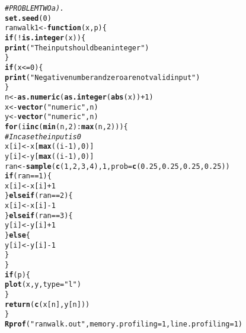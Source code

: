 \documentclass{article}\usepackage[]{graphicx}\usepackage[]{color}
\makeatletter
\newcommand{\hlnum}[1]{\textcolor[rgb]{0.686,0.059,0.569}{#1}}%
\newcommand{\hlstr}[1]{\textcolor[rgb]{0.192,0.494,0.8}{#1}}%
\newcommand{\hlcom}[1]{\textcolor[rgb]{0.678,0.584,0.686}{\textit{#1}}}%
\newcommand{\hlopt}[1]{\textcolor[rgb]{0,0,0}{#1}}%
\newcommand{\hlstd}[1]{\textcolor[rgb]{0.345,0.345,0.345}{#1}}%
\newcommand{\hlkwa}[1]{\textcolor[rgb]{0.161,0.373,0.58}{\textbf{#1}}}%
\newcommand{\hlkwb}[1]{\textcolor[rgb]{0.69,0.353,0.396}{#1}}%
\newcommand{\hlkwc}[1]{\textcolor[rgb]{0.333,0.667,0.333}{#1}}%
\newcommand{\hlkwd}[1]{\textcolor[rgb]{0.737,0.353,0.396}{\textbf{#1}}}%
\newenvironment{kframe}{%
 \def\at@end@of@kframe{}%
 \ifinner\ifhmode%
  \def\at@end@of@kframe{\end{minipage}}%
  \begin{minipage}{\columnwidth}%
 \fi\fi%
 \def\FrameCommand##1{\hskip\@totalleftmargin \hskip-\fboxsep
 \colorbox{shadecolor}{##1}\hskip-\fboxsep
     \hskip-\linewidth \hskip-\@totalleftmargin \hskip\columnwidth}%
 \MakeFramed {\advance\hsize-\width
   \@totalleftmargin\z@ \linewidth\hsize
   \@setminipage}}%
 {\par\unskip\endMakeFramed%
 \at@end@of@kframe}
\newenvironment{knitrout}{}{} %
\makeatother
\begin{document}
\begin{knitrout}
\color{fgcolor}\begin{kframe}
\begin{alltt}
\hlcom{# PROBLEM TWO a).}
\hlkwd{set.seed}\hlstd{(}\hlnum{0}\hlstd{)}
\hlstd{ranwalk1} \hlkwb{<-} \hlkwa{function}\hlstd{(}\hlkwc{x}\hlstd{,} \hlkwc{p}\hlstd{) \{}
    \hlkwa{if} \hlstd{(}\hlopt{!}\hlkwd{is.integer}\hlstd{(x)) \{}
        \hlkwd{print}\hlstd{(}\hlstr{"The input should be an integer"}\hlstd{)}
    \hlstd{\}}
    \hlkwa{if} \hlstd{(x} \hlopt{<=} \hlnum{0}\hlstd{) \{}
        \hlkwd{print}\hlstd{(}\hlstr{"Negative number and zero are not valid input"}\hlstd{)}
    \hlstd{\}}
    \hlstd{n} \hlkwb{<-} \hlkwd{as.numeric}\hlstd{(}\hlkwd{as.integer}\hlstd{(}\hlkwd{abs}\hlstd{(x))} \hlopt{+} \hlnum{1}\hlstd{)}
    \hlstd{x} \hlkwb{<-} \hlkwd{vector}\hlstd{(}\hlstr{"numeric"}\hlstd{, n)}
    \hlstd{y} \hlkwb{<-} \hlkwd{vector}\hlstd{(}\hlstr{"numeric"}\hlstd{, n)}
    \hlkwa{for} \hlstd{(i} \hlkwa{in} \hlkwd{c}\hlstd{(}\hlkwd{min}\hlstd{(n,} \hlnum{2}\hlstd{)}\hlopt{:}\hlkwd{max}\hlstd{(n,} \hlnum{2}\hlstd{))) \{}
        \hlcom{# In case the input is 0}
        \hlstd{x[i]} \hlkwb{<-} \hlstd{x[}\hlkwd{max}\hlstd{((i} \hlopt{-} \hlnum{1}\hlstd{),} \hlnum{0}\hlstd{)]}
        \hlstd{y[i]} \hlkwb{<-} \hlstd{y[}\hlkwd{max}\hlstd{((i} \hlopt{-} \hlnum{1}\hlstd{),} \hlnum{0}\hlstd{)]}
        \hlstd{ran} \hlkwb{<-} \hlkwd{sample}\hlstd{(}\hlkwd{c}\hlstd{(}\hlnum{1}\hlstd{,} \hlnum{2}\hlstd{,} \hlnum{3}\hlstd{,} \hlnum{4}\hlstd{),} \hlnum{1}\hlstd{,} \hlkwc{prob} \hlstd{=} \hlkwd{c}\hlstd{(}\hlnum{0.25}\hlstd{,} \hlnum{0.25}\hlstd{,} \hlnum{0.25}\hlstd{,} \hlnum{0.25}\hlstd{))}
        \hlkwa{if} \hlstd{(ran} \hlopt{==} \hlnum{1}\hlstd{) \{}
            \hlstd{x[i]} \hlkwb{<-} \hlstd{x[i]} \hlopt{+} \hlnum{1}
        \hlstd{\}} \hlkwa{else if} \hlstd{(ran} \hlopt{==} \hlnum{2}\hlstd{) \{}
            \hlstd{x[i]} \hlkwb{<-} \hlstd{x[i]} \hlopt{-} \hlnum{1}
        \hlstd{\}} \hlkwa{else if} \hlstd{(ran} \hlopt{==} \hlnum{3}\hlstd{) \{}
            \hlstd{y[i]} \hlkwb{<-} \hlstd{y[i]} \hlopt{+} \hlnum{1}
        \hlstd{\}} \hlkwa{else} \hlstd{\{}
            \hlstd{y[i]} \hlkwb{<-} \hlstd{y[i]} \hlopt{-} \hlnum{1}
        \hlstd{\}}
    \hlstd{\}}
    \hlkwa{if} \hlstd{(p) \{}
        \hlkwd{plot}\hlstd{(x, y,} \hlkwc{type} \hlstd{=} \hlstr{"l"}\hlstd{)}
    \hlstd{\}}
    \hlkwd{return}\hlstd{(}\hlkwd{c}\hlstd{(x[n], y[n]))}
\hlstd{\}}
\hlkwd{Rprof}\hlstd{(}\hlstr{"ranwalk.out"}\hlstd{,} \hlkwc{memory.profiling} \hlstd{=} \hlnum{1}\hlstd{,} \hlkwc{line.profiling} \hlstd{=} \hlnum{1}\hlstd{)}

\end{alltt}
\end{kframe}
\end{knitrout}
\end{document}
